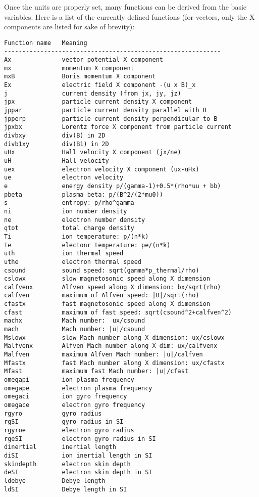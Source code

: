 \documentclass{article}
\begin{document}
Once the units are properly set, many functions can be derived
from the basic variables. Here is a list of the currently 
defined functions (for vectors, only the X components are 
listed for sake of brevity):
\begin{verbatim}
Function name   Meaning
------------------------------------------------------------
Ax              vector potential X component
mx              momentum X component
mxB             Boris momentum X component
Ex              electric field X component -(u x B)_x
j               current density (from jx, jy, jz)
jpx             particle current density X component
jppar           particle current density parallel with B
jpperp          particle current density perpendicular to B
jpxbx           Lorentz force X component from particle current
divbxy          div(B) in 2D
divb1xy         div(B1) in 2D
uHx             Hall velocity X component (jx/ne)
uH              Hall velocity 
uex             electron velocity X component (ux-uHx)
ue              electron velocity
e               energy density p/(gamma-1)+0.5*(rho*uu + bb)
pbeta           plasma beta: p/(B^2/(2*mu0))
s               entropy: p/rho^gamma
ni              ion number density        
ne              electron number density   
qtot            total charge density
Ti              ion temperature: p/(n*k)
Te              electonr temperature: pe/(n*k)
uth             ion thermal speed
uthe            electron thermal speed
csound          sound speed: sqrt(gamma*p_thermal/rho)
cslowx          slow magnetosonic speed along X dimension
calfvenx        Alfven speed along X dimension: bx/sqrt(rho)
calfven         maximum of Alfven speed: |B|/sqrt(rho)
cfastx          fast magnetosonic speed along X dimension
cfast           maximum of fast speed: sqrt(csound^2+calfven^2)
machx           Mach number:  ux/csound
mach            Mach number: |u|/csound
Mslowx          slow Mach number along X dimension: ux/cslowx
Malfvenx        Alfven Mach number along X dim: ux/calfvenx
Malfven         maximum Alfven Mach number: |u|/calfven
Mfastx          fast Mach number along X dimension: ux/cfastx
Mfast           maximum fast Mach number: |u|/cfast
omegapi         ion plasma frequency                                 
omegape         electron plasma frequency
omegaci         ion gyro frequency        
omegace         electron gyro frequency 
rgyro           gyro radius               
rgSI            gyro radius in SI         
rgyroe          electron gyro radius      
rgeSI           electron gyro radius in SI
dinertial       inertial length           
diSI            ion inertial length in SI 
skindepth       electron skin depth       
deSI            electron skin depth in SI 
ldebye          Debye length              
ldSI            Debye length in SI        
\end{verbatim}
\end{document}
